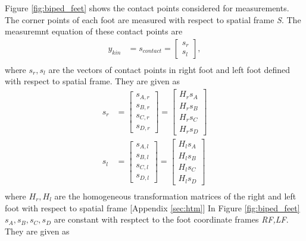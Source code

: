  Figure \ref{fig:biped_feet} shows the contact points considered for measurements. The corner points of each foot are measured with respect to spatial frame \emph{S}. The measuremnt equation of these contact points are
\begin{equation}
    \label{eq:y_kin}
    \begin{split}
    y_{kin} &= s_{contact} = \begin{bmatrix}s_{r}\\ s_{l}\end{bmatrix},\\
    \end{split}
\end{equation} where
$s_{r},s_{l}$ are the vectors of contact points in right foot and left foot defined with respect to spatial frame. They are given as
\begin{equation}
    \begin{split}
    s_{r} &= \begin{bmatrix} s_{A,r}\\ s_{B,r}\\ s_{C,r}\\ s_{D,r}\end{bmatrix}= \begin{bmatrix} {H}_{r}s_{A}\\  {H}_{r}s_{B}\\  {H}_{r}s_{C}\\  {H}_{r}s_{D}\end{bmatrix} \\
    s_{l} &= \begin{bmatrix} s_{A,l}\\ s_{B,l}\\ s_{C,l}\\ s_{D,l}\end{bmatrix}= \begin{bmatrix} {H}_{l}s_{A}\\  {H}_{l}s_{B}\\  {H}_{l}s_{C}\\  {H}_{l}s_{D}\end{bmatrix} \\
    \end{split}
\end{equation}
where ${H}_{r},{H}_{l}$ are the homogeneous transformation matrices of the right and left foot with respect to spatial frame [Appendix \ref{sec:htm}]
 In Figure \ref{fig:biped_feet} $s_A,s_B,s_C,s_D$ are constant with resptect to the foot coordinate frames \emph{RF,LF}. They are given as 
